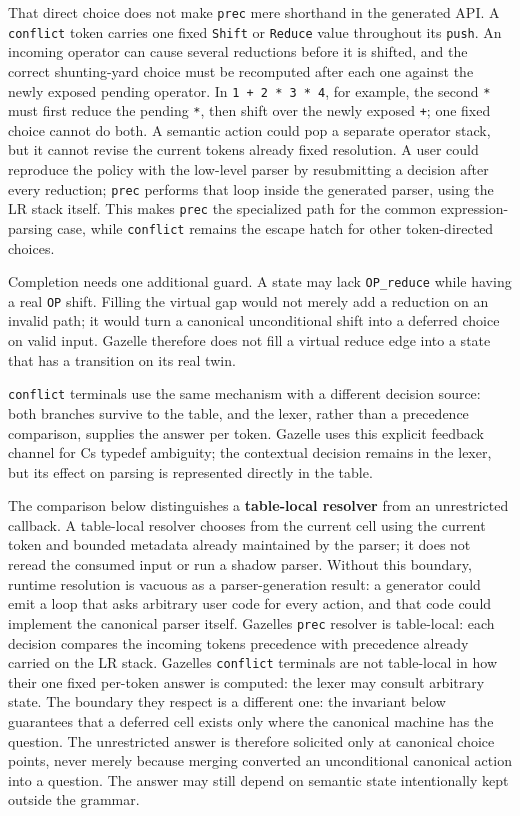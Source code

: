 \documentclass[
  10pt,
]{article}
\begin{document}
That direct choice does not make \texttt{prec} mere shorthand in the
generated API. A \texttt{conflict} token carries one fixed
\texttt{Shift} or \texttt{Reduce} value throughout its \texttt{push}. An
incoming operator can cause several reductions before it is shifted, and
the correct shunting-yard choice must be recomputed after each one
against the newly exposed pending operator. In
\texttt{1\ +\ 2\ *\ 3\ *\ 4}, for example, the second \texttt{*} must
first reduce the pending \texttt{*}, then shift over the newly exposed
\texttt{+}; one fixed choice cannot do both. A semantic action could pop
a separate operator stack, but it cannot revise the current
token\textquotesingle s already fixed resolution. A user could reproduce
the policy with the low-level parser by resubmitting a decision after
every reduction; \texttt{prec} performs that loop inside the generated
parser, using the LR stack itself. This makes \texttt{prec} the
specialized path for the common expression-parsing case, while
\texttt{conflict} remains the escape hatch for other token-directed
choices.

Completion needs one additional guard. A state may lack
\texttt{OP\_reduce} while having a real \texttt{OP} shift. Filling the
virtual gap would not merely add a reduction on an invalid path; it
would turn a canonical unconditional shift into a deferred choice on
valid input. Gazelle therefore does not fill a virtual reduce edge into
a state that has a transition on its real twin.

\texttt{conflict} terminals use the same mechanism with a different
decision source: both branches survive to the table, and the lexer,
rather than a precedence comparison, supplies the answer per token.
Gazelle uses this explicit feedback channel for C\textquotesingle s
typedef ambiguity; the contextual decision remains in the lexer, but its
effect on parsing is represented directly in the table.

The comparison below distinguishes a \textbf{table-local resolver} from
an unrestricted callback. A table-local resolver chooses from the
current cell using the current token and bounded metadata already
maintained by the parser; it does not reread the consumed input or run a
shadow parser. Without this boundary, runtime resolution is vacuous as a
parser-generation result: a generator could emit a loop that asks
arbitrary user code for every action, and that code could implement the
canonical parser itself. Gazelle\textquotesingle s \texttt{prec}
resolver is table-local: each decision compares the incoming
token\textquotesingle s precedence with precedence already carried on
the LR stack. Gazelle\textquotesingle s \texttt{conflict} terminals are
not table-local in how their one fixed per-token answer is computed: the
lexer may consult arbitrary state. The boundary they respect is a
different one: the invariant below guarantees that a deferred cell
exists only where the canonical machine has the question. The
unrestricted answer is therefore solicited only at canonical choice
points, never merely because merging converted an unconditional
canonical action into a question. The answer may still depend on
semantic state intentionally kept outside the grammar.
\end{document}
